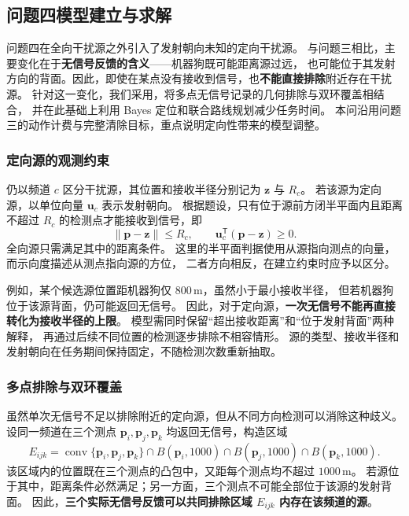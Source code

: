 \documentclass[UTF8,a4paper,12pt]{ctexart}
\begin{document}
\subsection{问题四模型建立与求解}
\label{sec:q4}

问题四在全向干扰源之外引入了发射朝向未知的定向干扰源。
与问题三相比，主要变化在于\textbf{无信号反馈的含义}——机器狗既可能距离源过远，
也可能位于其发射方向的背面。因此，即使在某点没有接收到信号，也\textbf{不能直接排除}附近存在干扰源。
针对这一变化，我们采用，将多点无信号记录的几何排除与双环覆盖相结合，
并在此基础上利用 Bayes 定位和联合路线规划减少任务时间。
本问沿用问题三的动作计费与完整清除目标，重点说明定向性带来的模型调整。

\subsubsection{定向源的观测约束}

仍以频道 $c$ 区分干扰源，其位置和接收半径分别记为 $\boldsymbol z$ 与 $R_c$。
若该源为定向源，以单位向量 $\boldsymbol u_c$ 表示发射朝向。
根据题设，只有位于源前方闭半平面内且距离不超过 $R_c$ 的检测点才能接收到信号，即
\begin{equation}
  \|\boldsymbol p-\boldsymbol z\|\leq R_c,
  \qquad \boldsymbol u_c^{\mathsf T}(\boldsymbol p-\boldsymbol z)\geq0.
  \label{eq:q4-reception}
\end{equation}
全向源只需满足其中的距离条件。
这里的半平面判据使用从源指向测点的向量，而示向度描述从测点指向源的方位，
二者方向相反，在建立约束时应予以区分。

例如，某个候选源位置距机器狗仅 $800\,\mathrm m$，虽然小于最小接收半径，
但若机器狗位于该源背面，仍可能返回无信号。
因此，对于定向源，\textbf{一次无信号不能再直接转化为接收半径的上限}。
模型需同时保留“超出接收距离”和“位于发射背面”两种解释，
再通过后续不同位置的检测逐步排除不相容情形。
源的类型、接收半径和发射朝向在任务期间保持固定，不随检测次数重新抽取。

\subsubsection{多点排除与双环覆盖}

虽然单次无信号不足以排除附近的定向源，但从不同方向检测可以消除这种歧义。
设同一频道在三个测点 $\boldsymbol p_i,\boldsymbol p_j,\boldsymbol p_k$ 均返回无信号，构造区域
\begin{equation}
  E_{ijk}=\operatorname{conv}\{\boldsymbol p_i,\boldsymbol p_j,\boldsymbol p_k\}
  \cap B(\boldsymbol p_i,1000)\cap B(\boldsymbol p_j,1000)\cap B(\boldsymbol p_k,1000).
  \label{eq:q4-exclusion}
\end{equation}
该区域内的位置既在三个测点的凸包中，又距每个测点均不超过 $1000\,\mathrm m$。
若源位于其中，距离条件必然满足；另一方面，三个测点不可能全部位于该源的发射背面。
因此，\textbf{三个实际无信号反馈可以共同排除区域 $E_{ijk}$ 内存在该频道的源}。
\end{document}
